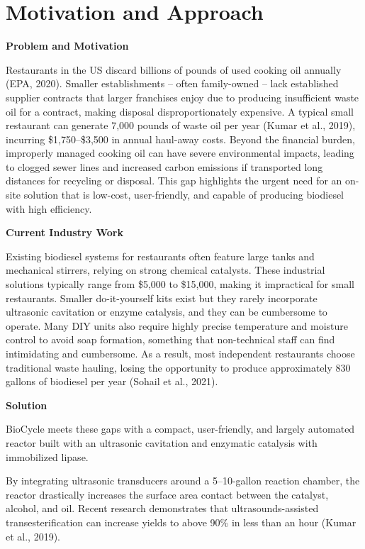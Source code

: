 \documentclass[10pt,twocolumn]{article}
\begin{document}
\section*{Motivation and Approach}

\textbf{Problem and Motivation}

Restaurants in the US discard billions of pounds of used cooking oil annually (EPA, 2020). Smaller establishments – often family-owned – lack established supplier contracts that larger franchises enjoy due to producing insufficient waste oil for a contract, making disposal disproportionately expensive. A typical small restaurant can generate 7,000 pounds of waste oil per year (Kumar et al., 2019), incurring \$1,750–\$3,500 in annual haul-away costs. Beyond the financial burden, improperly managed cooking oil can have severe environmental impacts, leading to clogged sewer lines and increased carbon emissions if transported long distances for recycling or disposal. This gap highlights the urgent need for an on-site solution that is low-cost, user-friendly, and capable of producing biodiesel with high efficiency.

\textbf{Current Industry Work}

Existing biodiesel systems for restaurants often feature large tanks and mechanical stirrers, relying on strong chemical catalysts. These industrial solutions typically range from \$5,000 to \$15,000, making it impractical for small restaurants. Smaller do-it-yourself kits exist but they rarely incorporate ultrasonic cavitation or enzyme catalysis, and they can be cumbersome to operate. Many DIY units also require highly precise temperature and moisture control to avoid soap formation, something that non-technical staff can find intimidating and cumbersome. As a result, most independent restaurants choose traditional waste hauling, losing the opportunity to produce approximately 830 gallons of biodiesel per year (Sohail et al., 2021).

\textbf{Solution}

BioCycle meets these gaps with a compact, user-friendly, and largely automated reactor built with an ultrasonic cavitation and enzymatic catalysis with immobilized lipase.

By integrating ultrasonic transducers around a 5–10-gallon reaction chamber, the reactor drastically increases the surface area contact between the catalyst, alcohol, and oil. Recent research demonstrates that ultrasounds-assisted transesterification can increase yields to above 90\% in less than an hour (Kumar et al., 2019). 
\end{document}
